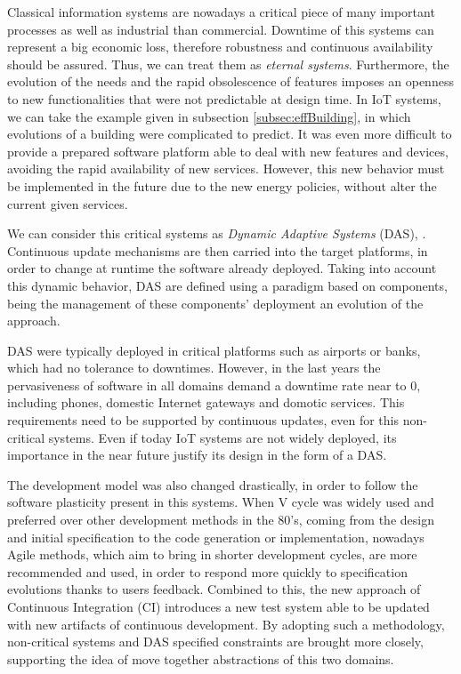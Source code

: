 Classical information systems are nowadays a critical piece of many important processes as well as industrial than commercial.
Downtime of this systems can represent a big economic loss, therefore robustness and continuous availability should be assured.
Thus, we can treat them as \textit{eternal systems}.
Furthermore, the evolution of the needs and the rapid obsolescence of features imposes an openness to new functionalities that were not predictable at design time.
In IoT systems, we can take the example given in subsection \ref{subsec:effBuilding}, in which evolutions of a building were complicated to predict.
It was even more difficult to provide a prepared software platform able to deal with new features and devices, avoiding the rapid availability of new services.
However, this new behavior must be implemented in the future due to the new energy policies, without alter the current given services.

We can consider this critical systems as \textit{Dynamic Adaptive Systems} (DAS)\cite{mckinley2004composing}, \cite{morin2009taming}.
Continuous update mechanisms are then carried into the target platforms, in order to change at runtime the software already deployed.
Taking into account this dynamic behavior, DAS are defined using a paradigm based on components, being the management of these components' deployment an evolution of the approach. %

DAS were typically deployed in critical platforms such as airports or banks, which had no tolerance to downtimes.
However, in the last years the pervasiveness of software in all domains demand a downtime rate near to 0, including phones, domestic Internet gateways and domotic services\cite{nain2008using}.
This requirements need to be supported by continuous updates, even for this non-critical systems.
Even if today IoT systems are not widely deployed, its importance in the near future justify its design in the form of a DAS.

The development model was also changed drastically, in order to follow the software plasticity present in this systems.
When V cycle was widely used and preferred over other development methods in the 80's, coming from the design and initial specification to the code generation or implementation, nowadays Agile methods\cite{stolberg2009enabling}, which aim to bring in shorter development cycles, are more recommended and used, in order to respond more quickly to specification evolutions thanks to users feedback.
Combined to this, the new approach of Continuous Integration (CI) introduces a new test system able to be updated with new artifacts of continuous development.
By adopting such a methodology, non-critical systems and DAS specified constraints are brought more closely, supporting the idea of move together abstractions of this two domains.


